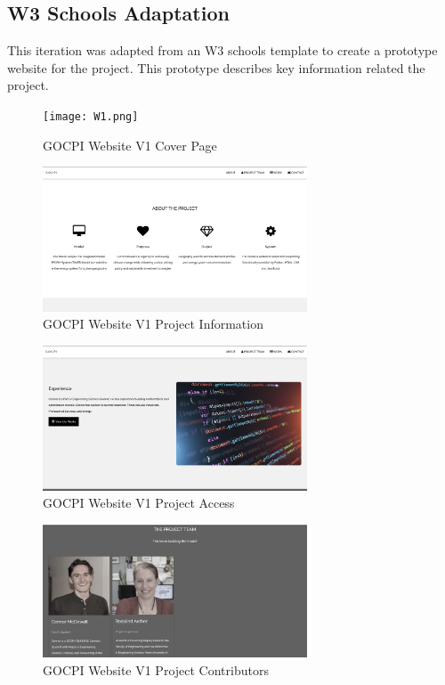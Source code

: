 \documentclass[12pt]{article}
\begin{document}
\subsection{W3 Schools Adaptation}
This iteration was adapted from an W3 schools template to create a prototype website for the project.
This prototype describes key information related the project.
\begin{figure}[H]
    \centering
	\texttt{[image: W1.png]}
    \caption{GOCPI Website V1 Cover Page}
    \label{fig:WV1CP}
\end{figure}
\begin{figure}[H]
    \centering
	\includegraphics[width=0.7\textwidth]{W2.png}
    \caption{GOCPI Website V1 Project Information}
    \label{fig:WV1PI}
\end{figure}
\begin{figure}[H]
    \centering
	\includegraphics[width=0.7\textwidth]{W3.png}
    \caption{GOCPI Website V1 Project Access}
    \label{fig:WV1PA}
\end{figure}
\begin{figure}[H]
    \centering
	\includegraphics[width=0.7\textwidth]{W4.png}
    \caption{GOCPI Website V1 Project Contributors}
    \label{fig:WV1PC}
\end{figure}
\end{document}
